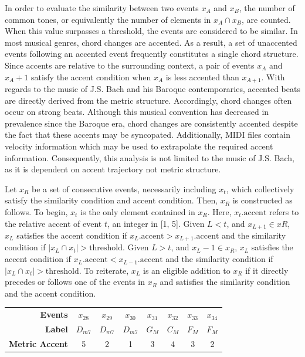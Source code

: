 \documentclass{article} %
\begin{document}
In order to evaluate the similarity between two events $x_A$ and $x_B$, the number of common tones, or equivalently the number of elements in $x_A \cap x_B$, are counted. When this value surpasses a threshold, the events are considered to be similar. In most musical genres, chord changes are accented. As a result, a set of unaccented events following an accented event frequently constitutes a single chord structure. Since accents are relative to the surrounding context, a pair of events $x_A$ and $x_A+1$ satisfy the accent condition when $x_A$ is less accented than $x_{A+1}$. With regards to the music of J.S. Bach and his Baroque contemporaries, accented beats are directly derived from the metric structure. Accordingly, chord changes often occur on strong beats. Although this musical convention has decreased in prevalence since the Baroque era, chord changes are consistently accented despite the fact that these accents may be syncopated. Additionally, MIDI files contain velocity information which may be used to extrapolate the required accent information. Consequently, this analysis is not limited to the music of J.S. Bach, as it is dependent on accent trajectory not metric structure.

Let $x_R$ be a set of consecutive events, necessarily including $x_t$, which collectively satisfy the similarity condition and accent condition. Then, $x_R$ is constructed as follows. To begin, $x_t$ is the only element contained in $x_R$. Here, $x_t.\text{accent}$ refers to the relative accent of event $t$, an integer in [1, 5]. Given $L < t$, and $x_{L+1} \in xR$, $x_L$ satisfies the accent condition if $x_L.\text{accent} > x_{L+1}.\text{accent}$ and the similarity condition if $|x_L \cap x_t| > \text{threshold}$. Given $L > t$, and $x_L-1 \in x_R$, $x_L$ satisfies the accent condition if $x_L.\text{accent} < x_{L-1}.\text{accent}$ and the similarity condition if $|x_L \cap x_t| > \text{threshold}$. To reiterate, $x_L$ is an eligible addition to $x_R$ if it directly precedes or follows one of the events in $x_R$ and satisfies the similarity condition and the accent condition.

\begin{table}
  \begin{tabular}{ r | c c c c c c c }
    \textbf{Events}        & $x_{28}$ & $x_{29}$ & $x_{30}$ & $x_{31}$ & $x_{32}$ & $x_{33}$ & $x_{34}$ \\
    \textbf{Label}         & $D_{m7}$ & $D_{m7}$ & $D_{m7}$ & $G_M$ & $C_M$ & $F_M$ & $F_M$ \\
    \textbf{Metric Accent} & 5 & 2 & 1 & 3 & 4 & 3 & 2 \\
  \end{tabular}
  \label{Similarity conditions}
\end{table}
\end{document}
